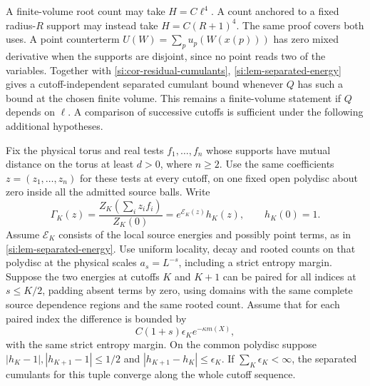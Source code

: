 \documentclass[11pt,letterpaper,reqno]{amsart}
\makeatletter
\numberwithin{equation}{section}
\theoremstyle{definition}
\newcommand{\ms@minorstart}{%
  \pushQED{\qed}\renewcommand{\qedsymbol}{$\blacksquare$}}
\newenvironment{proposition}[1][]{\ms@minorstart\ms@proposition[#1]}
  {\popQED\endms@proposition}
\theoremstyle{remark}
\makeatother
\begin{document}
A finite-volume root count may take $H=C\ell^4$. A count anchored
to a fixed radius-$R$ support may instead take $H=C(R+1)^4$.
The same proof covers both uses. A point counterterm
$U(W)=\sum_p u_p(W(x(p)))$ has zero mixed derivative when the
supports are disjoint, since no point reads two of the variables.
Together with \cref{si:cor-residual-cumulants},
\cref{si:lem-separated-energy} gives a cutoff-independent separated
cumulant bound whenever $Q$ has such a bound at the chosen finite
volume. This remains a finite-volume statement if $Q$ depends on
$\ell$. A comparison of successive cutoffs is sufficient under the following
additional hypotheses.

\begin{samepage}
\begin{proposition}[A sufficient comparison of two cutoffs]
\label{si:prop-cutoff-comparison}
Fix the physical torus and real tests $f_1,\ldots,f_n$ whose
supports have mutual distance on the torus at least $d>0$, where $n\ge2$.
Use the same coefficients $z=(z_1,\ldots,z_n)$ for these tests
at every cutoff, on one fixed open polydisc about zero inside
all the admitted source balls. Write
\[
 \Gamma_K(z)=\frac{Z_K(\sum_i z_i f_i)}{Z_K(0)}
      =e^{\mathcal E_K(z)}h_K(z),\qquad h_K(0)=1.
\]
Assume $\mathcal E_K$ consists of the local source energies and
possibly point terms, as in \cref{si:lem-separated-energy}.
Use uniform locality, decay and rooted counts on that polydisc
at the physical scales $a_s=L^{-s}$, including a strict entropy
margin. Suppose the two energies at cutoffs $K$ and $K+1$ can
be paired for all indices at $s\le K/2$, padding absent terms
by zero, using domains with the same complete source dependence
regions and the same rooted count. Assume
that for each paired index the difference is bounded by
\[
 C(1+s)\epsilon_K e^{-\kappa m(X)},
\]
with the same strict entropy margin. On the common polydisc
suppose $|h_K-1|,|h_{K+1}-1|\le1/2$ and
$|h_{K+1}-h_K|\le\epsilon_K$. If $\sum_K\epsilon_K<\infty$,
the separated cumulants for this tuple converge along the
whole cutoff sequence.
\end{proposition}
\end{samepage}
\end{document}
